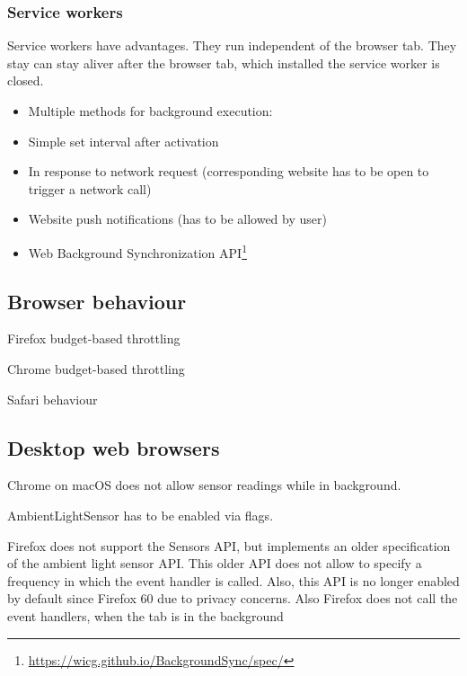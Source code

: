 \documentclass[article,type=bsc,colorback,accentcolor=tud9c]{tudthesis}
\begin{document}
  
  
  \subsubsection{Service workers}

  Service workers have advantages. They run independent of the browser tab. They stay can stay aliver after the browser tab, which installed the service worker is closed.

  \begin{itemize}   
  \item Multiple methods for background execution:

  \item Simple set interval after activation

  \item In response to network request (corresponding website has to be open to trigger a network call)

  \item Website push notifications (has to be allowed by user)

  \item Web Background Synchronization API\footnote{\url{https://wicg.github.io/BackgroundSync/spec/}}
  \end{itemize}

  
  \newpage

  \subsection{Browser behaviour}


  Firefox budget-based throttling
  \autocite{mdn-page-visibility}

  Chrome budget-based throttling
  \autocite{chrome-background-tabs}

  Safari behaviour

 
  
  \subsection{Desktop web browsers}

  Chrome on macOS does not allow sensor readings while in background.

  AmbientLightSensor has to be enabled via flags.
  

  Firefox does not support the Sensors API, but implements an older specification of the ambient light sensor API. This older API does not allow to specify a frequency in which the event handler is called. Also, this API is no longer enabled by default since Firefox 60 due to privacy concerns. Also Firefox does not call the event handlers, when the tab is in the background
\end{document}
